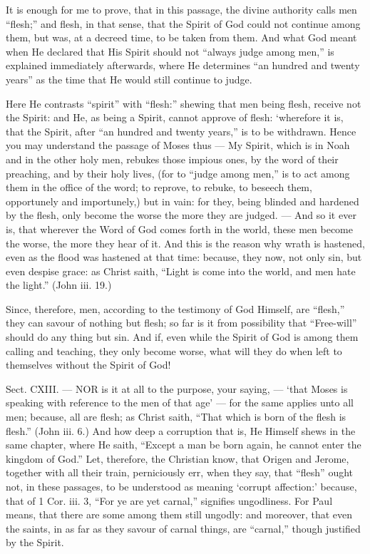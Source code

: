 It is enough for me to prove, that in this passage, the divine authority calls men “flesh;” and flesh, in that sense, that the Spirit of God could not continue among them, but was, at a decreed time, to be taken from them. And what God meant when He declared that His Spirit should not “always judge among men,” is explained immediately afterwards, where He determines “an hundred and twenty years” as the time that He would still continue to judge.

Here He contrasts “spirit” with “flesh:” shewing that men being flesh, receive not the Spirit: and He, as being a Spirit, cannot approve of flesh: ‘wherefore it is, that the Spirit, after “an hundred and twenty years,” is to be withdrawn. Hence you may understand the passage of Moses thus — My Spirit, which is in Noah and in the other holy men, rebukes those impious ones, by the word of their preaching, and by their holy lives, (for to “judge among men,” is to act among them in the office of the word; to reprove, to rebuke, to beseech them, opportunely and importunely,) but in vain: for they, being blinded and hardened by the flesh, only become the worse the more they are judged. — And so it ever is, that wherever the Word of God comes forth in the world, these men become the worse, the more they hear of it. And this is the reason why wrath is hastened, even as the flood was hastened at that time: because, they now, not only sin, but even despise grace: as Christ saith, “Light is come into the world, and men hate the light.” (John iii. 19.)

Since, therefore, men, according to the testimony of God Himself, are “flesh,” they can savour of nothing but flesh; so far is it from possibility that “Free-will” should do any thing but sin. And if, even while the Spirit of God is among them calling and teaching, they only become worse, what will they do when left to themselves without the Spirit of God!


Sect. CXIII. — NOR is it at all to the purpose, your saying, — ‘that Moses is speaking with reference to the men of that age’ — for the same applies unto all men; because, all are flesh; as Christ saith, “That which is born of the flesh is flesh.” (John iii. 6.) And how deep a corruption that is, He Himself shews in the same chapter, where He saith, “Except a man be born again, he cannot enter the kingdom of God.” Let, therefore, the Christian know, that Origen and Jerome, together with all their train, perniciously err, when they say, that “flesh” ought not, in these passages, to be understood as meaning ‘corrupt affection:’ because, that of 1 Cor. iii. 3, “For ye are yet carnal,” signifies ungodliness. For Paul means, that there are some among them still ungodly: and moreover, that even the saints, in as far as they savour of carnal things, are “carnal,” though justified by the Spirit.

